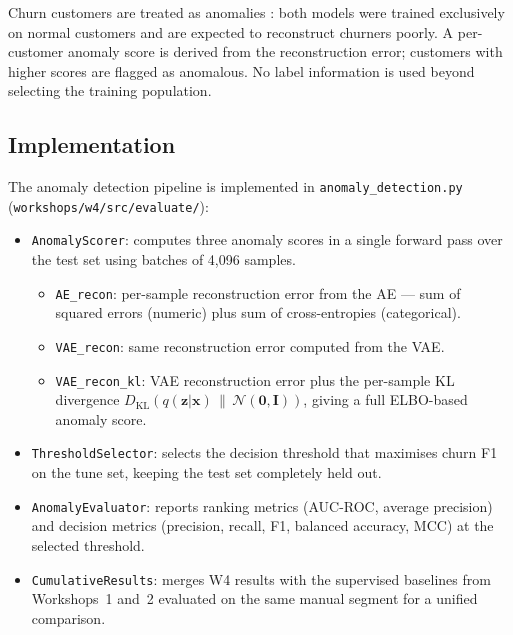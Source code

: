\documentclass{article}
\begin{document}
Churn customers are treated as anomalies \cite{chandola2009anomaly}: both models were
trained exclusively on normal customers and are expected to reconstruct churners poorly.
A per-customer anomaly score is derived from the reconstruction error; customers with
higher scores are flagged as anomalous. No label information is used beyond selecting
the training population.

\subsection{Implementation}

The anomaly detection pipeline is implemented in
\texttt{anomaly\_detection.py} (\texttt{workshops/w4/src/evaluate/}):

\begin{itemize}

\item \texttt{AnomalyScorer}: computes three anomaly scores in a single forward pass
over the test set using batches of 4{,}096 samples.
\begin{itemize}
    \item \texttt{AE\_recon}: per-sample reconstruction error from the AE ---
          sum of squared errors (numeric) plus sum of cross-entropies (categorical).
    \item \texttt{VAE\_recon}: same reconstruction error computed from the VAE.
    \item \texttt{VAE\_recon\_kl}: VAE reconstruction error plus the per-sample KL
          divergence $D_\text{KL}(q(\mathbf{z}|\mathbf{x})\,\|\,\mathcal{N}(\mathbf{0},\mathbf{I}))$,
          giving a full ELBO-based anomaly score.
\end{itemize}

\item \texttt{ThresholdSelector}: selects the decision threshold that maximises
churn F1 on the tune set, keeping the test set completely held out.

\item \texttt{AnomalyEvaluator}: reports ranking metrics (AUC-ROC, average precision)
and decision metrics (precision, recall, F1, balanced accuracy, MCC) at the selected
threshold.

\item \texttt{CumulativeResults}: merges W4 results with the supervised baselines
from Workshops~1 and~2 evaluated on the same manual segment for a unified comparison.

\end{itemize}
\end{document}
